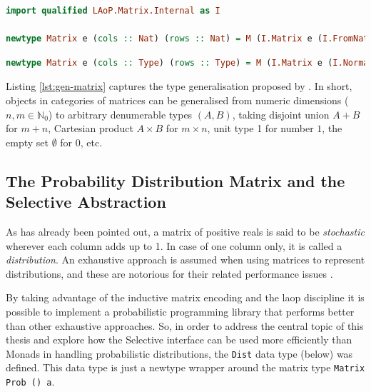 \documentclass[
  oneside,
  11pt, a4paper,
  footinclude=true,
  headinclude=true,
  cleardoublepage=empty
]{scrbook}
\theoremstyle{definition}
\theoremstyle{definition}
\begin{document}
        \begin{lstlisting}[language=Haskell, caption={Dimensions are type level naturals},captionpos=b]
import qualified LAoP.Matrix.Internal as I

newtype Matrix e (cols :: Nat) (rows :: Nat) = M (I.Matrix e (I.FromNat cols) (I.FromNat rows))
        \end{lstlisting}
        
        \begin{lstlisting}[language=Haskell, caption={Dimensions are arbitrary data types},captionpos=b, label={lst:gen-matrix}]
newtype Matrix e (cols :: Type) (rows :: Type) = M (I.Matrix e (I.Normalize cols) (I.Normalize rows))
        \end{lstlisting}
        
        Listing \ref{lst:gen-matrix} captures the type generalisation proposed by \cite{oliveira2012towards}. In short, objects in categories of matrices can be generalised from numeric dimensions ($n, m \in \mathbb{N}_0$) to arbitrary denumerable types $(A,B)$, taking disjoint union $A + B$ for $m + n$, Cartesian product $A \times B$ for $m \times n$, unit type 1 for number $1$, the empty set $\emptyset$ for $0$, etc.
        
        \subsection{The Probability Distribution Matrix and the Selective Abstraction}
        
         As has already been pointed out, a matrix of positive reals is said to be \emph{stochastic} wherever each column adds up to 1. In case of one column only, it is called a \emph{distribution}. An exhaustive approach is assumed when using matrices to represent distributions, and these are notorious for their related performance issues \citep{Scibior:2015:PPP:2887747.2804317, kidd2007build}.
         
         By taking advantage of the inductive matrix encoding and the \gls{laop} discipline it is possible to implement a probabilistic programming library that performs better than other exhaustive approaches. So, in order to address the central topic of this thesis and explore how the Selective interface can be used more efficiently than Monads in handling probabilistic distributions, the \texttt{Dist} data type (below) was defined. This data type is just a newtype wrapper around the matrix type \texttt{Matrix Prob () a}.
        
\end{document}
